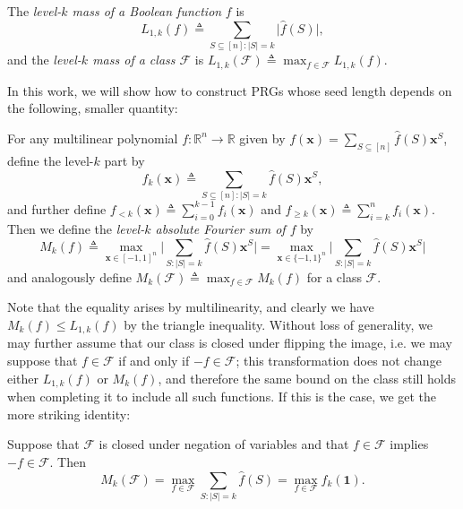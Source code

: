 \begin{definition}
The \emph{level-$k$ mass of a Boolean function} $f$ is 
\begin{equation*}
    L_{1,k}(f)\triangleq \sum_{S\subseteq [n]:\vert S\vert=k} \vert \hat{f}(S)\vert,
\end{equation*}
and the \emph{level-$k$ mass of a class $\mathcal{F}$} is
$L_{1,k}(\mathcal{F})\triangleq \max_{f\in \mathcal{F}} L_{1,k}(f)$.
\end{definition}

In this work, we will show how to construct PRGs whose seed length depends on the following, smaller quantity:

\begin{definition}
\label{def:mk}
For any multilinear polynomial $f:\mathbb{R}^n\to \mathbb{R}$ given by $f(\mathbf{x})=\sum_{S\subseteq [n]} \hat{f}(S)\mathbf{x}^S$, define the level-$k$ part by
\begin{equation*}
    f_{k}(\mathbf{x})\triangleq\sum_{S\subseteq [n]:\vert S\vert=k} \hat{f}(S)\mathbf{x}^S,
\end{equation*}
and further define $f_{<k}(\mathbf{x})\triangleq \sum_{i=0}^{k-1} f_i(\mathbf{x})$ and $f_{\geq k}(\mathbf{x})\triangleq \sum_{i=k}^{n} f_i(\mathbf{x})$. 
Then we define the \emph{level-$k$ absolute Fourier sum of $f$} by
\begin{equation*}
    M_k(f)\triangleq \max_{\mathbf{x}\in [-1,1]^n}\bigg\vert \sum_{S:\vert S\vert=k} \hat{f}(S)\mathbf{x}^S\bigg\vert =  \max_{\mathbf{x}\in \{-1,1\}^n}\bigg\vert \sum_{S:\vert S\vert=k} \hat{f}(S)\mathbf{x}^S\bigg\vert
\end{equation*}
and analogously define $M_k(\mathcal{F})\triangleq \max_{f\in \mathcal{F}} M_k(f)$ for a class $\mathcal{F}$.
\end{definition}
Note that the equality arises by multilinearity, and clearly we have $M_k(f)\leq L_{1,k}(f)$ by the triangle inequality. Without loss of generality, we may further assume that our class is closed under flipping the image, i.e. we may suppose that $f\in \mathcal{F}$ if and only if $-f\in \mathcal{F}$; this transformation does not change either $L_{1,k}(f)$ or $M_k(f)$, and therefore the same bound on the class still holds when completing it to include all such functions. If this is the case, we get the more striking identity:

\begin{lemma}
\label{lem:unsigned}
Suppose that $\mathcal{F}$ is closed under negation of variables and that $f\in \mathcal{F}$ implies $-f\in \mathcal{F}$. Then
\begin{equation*}
    M_k(\mathcal{F})=\max_{f\in \mathcal{F}} \sum_{S:\vert S\vert = k} \hat{f}(S) = \max_{f \in  \mathcal{F} } f_k \left( \mathbf{1} \right) .
\end{equation*}
\end{lemma}

